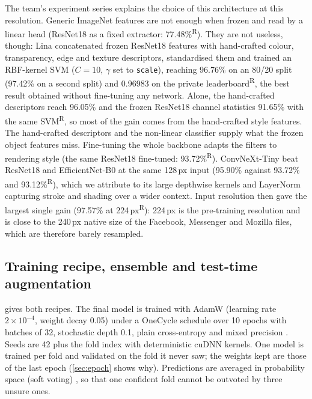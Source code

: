 \documentclass[11pt,a4paper]{article}
\newcommand{\rep}{\textsuperscript{\textcolor{reported}{\sffamily\scriptsize R}}}
\newcommand{\pct}[1]{#1\%}
\begin{document}
The team's experiment series explains the choice of this architecture at this resolution. Generic ImageNet features are not enough when frozen and read by a linear head (ResNet18 \cite{he2016resnet} as a fixed extractor: \pct{77.48}\rep). They are not useless, though: Lina concatenated frozen ResNet18 features with hand-crafted colour, transparency, edge and texture descriptors, standardised them and trained an RBF-kernel SVM ($C=10$, $\gamma$ set to \texttt{scale}), reaching \pct{96.76} on an 80/20 split (\pct{97.42} on a second split) and 0.96983 on the private leaderboard\rep, the best result obtained without fine-tuning any network. Alone, the hand-crafted descriptors reach \pct{96.05} and the frozen ResNet18 channel statistics \pct{91.65} with the same SVM\rep, so most of the gain comes from the hand-crafted style features. The hand-crafted descriptors and the non-linear classifier supply what the frozen object features miss. Fine-tuning the whole backbone adapts the filters to rendering style (the same ResNet18 fine-tuned: \pct{93.72}\rep). ConvNeXt-Tiny beat ResNet18 and EfficientNet-B0 \cite{tan2019efficientnet} at the same 128\,px input (\pct{95.90} against \pct{93.72} and \pct{93.12}\rep), which we attribute to its large depthwise kernels and LayerNorm capturing stroke and shading over a wider context. Input resolution then gave the largest single gain (\pct{97.57} at 224\,px\rep): 224\,px is the pre-training resolution and is close to the 240\,px native size of the Facebook, Messenger and Mozilla files, which are therefore barely resampled.

\subsection{Training recipe, ensemble and test-time augmentation}
 gives both recipes. The final model is trained with AdamW (learning rate $2\times10^{-4}$, weight decay 0.05) under a OneCycle schedule over 10 epochs with batches of 32, stochastic depth 0.1, plain cross-entropy and mixed precision \cite{micikevicius2018mixed}. Seeds are 42 plus the fold index with deterministic cuDNN kernels. One model is trained per fold and validated on the fold it never saw; the weights kept are those of the last epoch (\cref{sec:epoch} shows why). Predictions are averaged in probability space (soft voting) \cite{lakshminarayanan2017ensembles}, so that one confident fold cannot be outvoted by three unsure ones.
\end{document}
